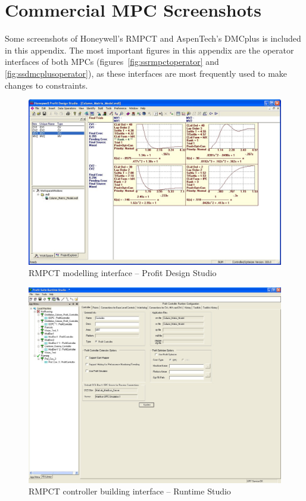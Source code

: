 \chapter{Commercial MPC Screenshots}\label{app:screenshots}
\begin{overview}
  Some screenshots of Honeywell's RMPCT and AspenTech's DMCplus is included in this appendix.
  The most important figures in this appendix are the operator interfaces of both MPCs (figures~\ref{fig:ssrmpctoperator} and \ref{fig:ssdmcplusoperator}), as these interfaces are most frequently used to make changes to constraints.
\end{overview}

\newpage

\begin{landscape}

  \begin{figure}[htbp]
    \centering
      \includegraphics[width=25cm]{graph/ss_rmpctdesignstudio.jpg}
    \caption[RMPCT Profit Design Studio interface]{RMPCT modelling interface -- Profit Design Studio}
    \label{fig:ssrmpctmodel}
  \end{figure}

  \begin{figure}[htbp]
    \centering
      \includegraphics[width=20cm]{graph/ss_rmpctruntimestudio.jpg}
    \caption[RMPCT Runtime Studio interface]{RMPCT controller building interface -- Runtime Studio}
    \label{fig:ssrmpctcontrolbuild}
  \end{figure}


\end{landscape}
